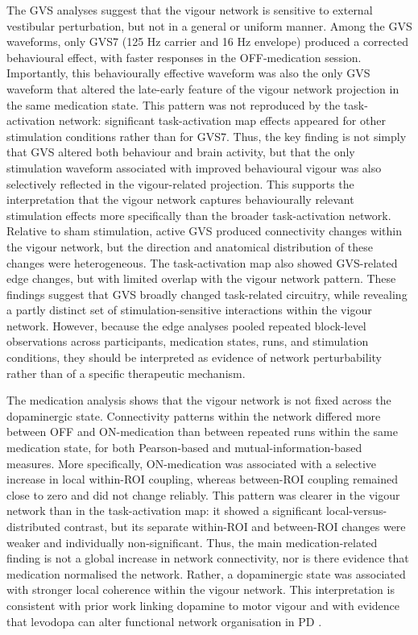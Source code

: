 \documentclass[utf8]{FrontiersinHarvard}
\begin{document}
The GVS analyses suggest that the vigour network is sensitive to external vestibular perturbation, but not in a general or uniform manner. Among the GVS waveforms, only GVS7 (125 Hz carrier and 16 Hz envelope) produced a corrected behavioural effect, with faster responses in the OFF-medication session. Importantly, this behaviourally effective waveform was also the only GVS waveform that altered the late-early feature of the vigour network projection in the same medication state. This pattern was not reproduced by the task-activation network: significant task-activation map effects appeared for other stimulation conditions rather than for GVS7. Thus, the key finding is not simply that GVS altered both behaviour and brain activity, but that the only stimulation waveform associated with improved behavioural vigour was also selectively reflected in the vigour-related projection. This supports the interpretation that the vigour network captures behaviourally relevant stimulation effects more specifically than the broader task-activation network. Relative to sham stimulation, active GVS produced connectivity changes within the vigour network, but the direction and anatomical distribution of these changes were heterogeneous. The task-activation map also showed GVS-related edge changes, but with limited overlap with the vigour network pattern. These findings suggest that GVS broadly changed task-related circuitry, while revealing a partly distinct set of stimulation-sensitive interactions within the vigour network. However, because the edge analyses pooled repeated block-level observations across participants, medication states, runs, and stimulation conditions, they should be interpreted as evidence of network perturbability rather than of a specific therapeutic mechanism.


The medication analysis shows that the vigour network is not fixed across the dopaminergic state. Connectivity patterns within the network differed more between OFF and ON-medication than between repeated runs within the same medication state, for both Pearson-based and mutual-information-based measures. More specifically, ON-medication was associated with a selective increase in local within-ROI coupling, whereas between-ROI coupling remained close to zero and did not change reliably. This pattern was clearer in the vigour network than in the task-activation map: it showed a significant local-versus-distributed contrast, but its separate within-ROI and between-ROI changes were weaker and individually non-significant. Thus, the main medication-related finding is not a global increase in network connectivity, nor is there evidence that medication normalised the network. Rather, a dopaminergic state was associated with stronger local coherence within the vigour network. This interpretation is consistent with prior work linking dopamine to motor vigour and with evidence that levodopa can alter functional network organisation in PD \citep{niv2007tonic,berman2016levodopa,zenon2016dopamine,mazzoni2007parkinson}.
\end{document}
